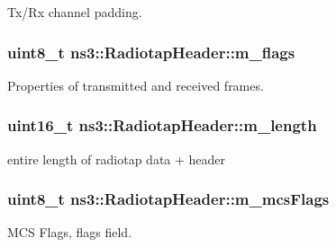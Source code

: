 Tx/\+Rx channel padding. 

\subsubsection[{\texorpdfstring{m\+\_\+flags}{m_flags}}]{\setlength{\rightskip}{0pt plus 5cm}uint8\+\_\+t ns3\+::\+Radiotap\+Header\+::m\+\_\+flags\hspace{0.3cm}{\ttfamily [private]}}\hypertarget{classns3_1_1RadiotapHeader_aefad1b59aaf9f374036d10b61c2b34fb}{}\label{classns3_1_1RadiotapHeader_aefad1b59aaf9f374036d10b61c2b34fb}


Properties of transmitted and received frames. 

\subsubsection[{\texorpdfstring{m\+\_\+length}{m_length}}]{\setlength{\rightskip}{0pt plus 5cm}uint16\+\_\+t ns3\+::\+Radiotap\+Header\+::m\+\_\+length\hspace{0.3cm}{\ttfamily [private]}}\hypertarget{classns3_1_1RadiotapHeader_a6894ef017e95e58463eac5e435507a33}{}\label{classns3_1_1RadiotapHeader_a6894ef017e95e58463eac5e435507a33}


entire length of radiotap data + header 

\subsubsection[{\texorpdfstring{m\+\_\+mcs\+Flags}{m_mcsFlags}}]{\setlength{\rightskip}{0pt plus 5cm}uint8\+\_\+t ns3\+::\+Radiotap\+Header\+::m\+\_\+mcs\+Flags\hspace{0.3cm}{\ttfamily [private]}}\hypertarget{classns3_1_1RadiotapHeader_aaec55970b628d47aff49162578ab00eb}{}\label{classns3_1_1RadiotapHeader_aaec55970b628d47aff49162578ab00eb}


M\+CS Flags, flags field. 

